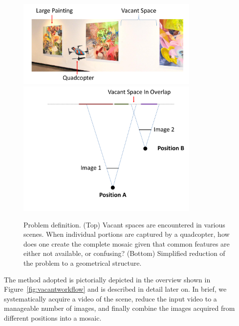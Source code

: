 \begin{figure}[h!]
  \centering
  \includegraphics[width=0.8\textwidth]{figures/vacantSpaces/indoor}\\
  \includegraphics[width=0.8\textwidth]{figures/vacantSpaces/stereoOverlap}\\

  \caption[Problem definition]{ \label{fig:schematic} Problem definition. (Top)
  Vacant spaces are encountered in various scenes.  When individual portions are
    captured by a quadcopter, how does one create the complete mosaic
    given that common features are either not available, or
    confusing? (Bottom) Simplified reduction of the problem to a geometrical structure.
  }
\end{figure}    

The method adopted is pictorially depicted in the overview shown in
Figure~\ref{fig:vacantworkflow} and is described in detail later on.  In
brief, we systematically acquire a video of the scene, reduce the
input video to a manageable number of images, and finally combine the
images acquired from different positions into a mosaic.

